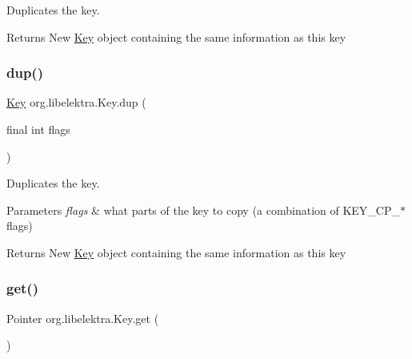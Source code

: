 Duplicates the key. 

\begin{DoxyReturn}{Returns}
New \hyperlink{classorg_1_1libelektra_1_1Key}{Key} object containing the same information as this key 
\end{DoxyReturn}
\mbox{\label{classorg_1_1libelektra_1_1Key_a6243553376f0620cc76b03cc961a5dad}} 
\subsubsection{\texorpdfstring{dup()}{dup()}\hspace{0.1cm}{\footnotesize\ttfamily [2/2]}}
{\footnotesize\ttfamily \hyperlink{classorg_1_1libelektra_1_1Key}{Key} org.\+libelektra.\+Key.\+dup (\begin{DoxyParamCaption}\item[{final int}]{flags }\end{DoxyParamCaption})\hspace{0.3cm}{\ttfamily [inline]}}



Duplicates the key. 


\begin{DoxyParams}{Parameters}
{\em flags} & what parts of the key to copy (a combination of K\+E\+Y\+\_\+\+C\+P\+\_\+$\ast$ flags)\\
\hline
\end{DoxyParams}
\begin{DoxyReturn}{Returns}
New \hyperlink{classorg_1_1libelektra_1_1Key}{Key} object containing the same information as this key 
\end{DoxyReturn}
\mbox{\label{classorg_1_1libelektra_1_1Key_a3c65267ac3d24c3eae35db576414fe4f}} 
\subsubsection{\texorpdfstring{get()}{get()}}
{\footnotesize\ttfamily Pointer org.\+libelektra.\+Key.\+get (\begin{DoxyParamCaption}{ }\end{DoxyParamCaption})\hspace{0.3cm}{\ttfamily [inline]}}



